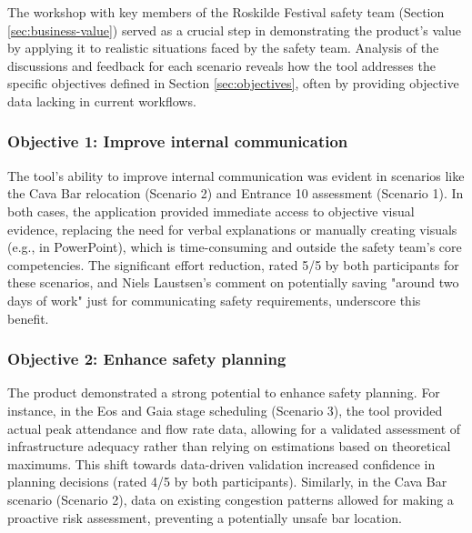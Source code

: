 The workshop with key members of the Roskilde Festival safety team (Section \ref{sec:business-value}) served as a crucial step in demonstrating the product's value by applying it to realistic situations faced by the safety team. Analysis of the discussions and feedback for each scenario reveals how the tool addresses the specific objectives defined in Section \ref{sec:objectives}, often by providing objective data lacking in current workflows.




\subsubsection{Objective 1: Improve internal communication}

The tool's ability to improve internal communication was evident in scenarios like the Cava Bar relocation (Scenario 2) and Entrance 10 assessment (Scenario 1). In both cases, the application provided immediate access to objective visual evidence, replacing the need for verbal explanations or manually creating visuals (e.g., in PowerPoint), which is time-consuming and outside the safety team's core competencies. The significant effort reduction, rated 5/5 by both participants for these scenarios, and Niels Laustsen's comment on potentially saving "around two days of work" just for communicating safety requirements, underscore this benefit.

\subsubsection{Objective 2: Enhance safety planning}

The product demonstrated a strong potential to enhance safety planning. For instance, in the Eos and Gaia stage scheduling (Scenario 3), the tool provided actual peak attendance and flow rate data, allowing for a validated assessment of infrastructure adequacy rather than relying on estimations based on theoretical maximums. This shift towards data-driven validation increased confidence in planning decisions (rated 4/5 by both participants). Similarly, in the Cava Bar scenario (Scenario 2), data on existing congestion patterns allowed for making a proactive risk assessment, preventing a potentially unsafe bar location.

